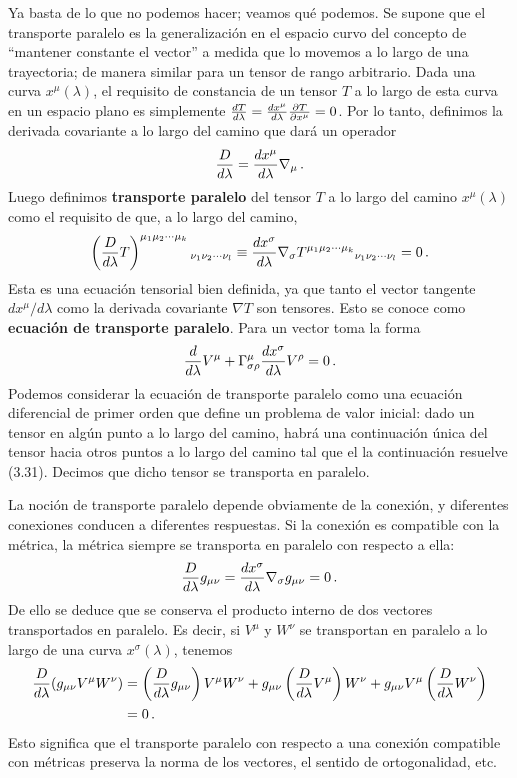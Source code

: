 \documentclass[11pt,b5paper,openany,twoside]{book}
\newcommand{\mn}{{\mu\nu}}
\begin{document}
Ya basta de lo que no podemos hacer; veamos qué podemos.
Se supone que el transporte paralelo es la generalización en el espacio curvo del concepto de ``mantener constante el vector'' a medida que lo movemos a lo largo de una trayectoria; de manera similar para un tensor de rango arbitrario.
Dada una curva $x^\mu(\lambda)$, el requisito de constancia de un tensor $T$ a lo largo de esta curva en un espacio plano es simplemente ${{dT}\over{d\lambda}} = {{dx^\mu}\over{d\lambda}}{{\partial T}\over{\partial x^\mu}}=0$.
Por lo tanto, definimos la derivada covariante a lo largo del camino que dará un operador
\begin{equation}
{{D}\over {d\lambda}} = {{dx^\mu}\over{d\lambda}}\nabla_\mu
\,.\label{3.30}
\end{equation}
Luego definimos {\bf transporte paralelo} del tensor $T$ a lo largo del camino $x^\mu(\lambda)$ como el requisito de que, a lo largo del camino,
\begin{equation}
\left({{D}\over{d\lambda}}T\right)^{\mu_1 \mu_2 \cdots
\mu_k}{}_{\nu_1 \nu_2 \cdots \nu_l} \equiv {{dx^\sigma}\over
{d\lambda}}\nabla_\sigma T^{\mu_1 \mu_2 \cdots
\mu_k}{}_{\nu_1 \nu_2 \cdots \nu_l} = 0\,.\label{3.31}
\end{equation}
Esta es una ecuación tensorial bien definida, ya que tanto el vector tangente $dx^\mu/d\lambda$ como la derivada covariante $\nabla T$ son tensores.
Esto se conoce como {\bf ecuación de transporte paralelo}.
Para un vector toma la forma
\begin{equation}
{{d}\over{d\lambda}} V^\mu
+ \Gamma^\mu_{\sigma\rho}{{dx^\sigma}\over{d\lambda}}V^\rho = 0\,.
\label{3.32}
\end{equation}
Podemos considerar la ecuación de transporte paralelo como una ecuación diferencial de primer orden que define un problema de valor inicial: dado un tensor en algún punto a lo largo del camino, habrá una continuación única del tensor hacia otros puntos a lo largo del camino tal que el la continuación resuelve (3.31).
Decimos que dicho tensor se transporta en paralelo.

La noción de transporte paralelo depende obviamente de la conexión, y diferentes conexiones conducen a diferentes respuestas.
Si la conexión es compatible con la métrica, la métrica siempre se transporta en paralelo con respecto a ella:
\begin{equation}
{{D}\over{d\lambda}}g_\mn = {{dx^\sigma}\over{d\lambda}}
\nabla_\sigma g_\mn =0\,.\label{3.33}
\end{equation}
De ello se deduce que se conserva el producto interno de dos vectores transportados en paralelo.
Es decir, si $V^\mu$ y $W^\nu$ se transportan en paralelo a lo largo de una curva $x^\sigma(\lambda)$, tenemos
\begin{align}
{{D}\over{d\lambda}}(g_\mn V^\mu W^\nu) &=
\left({{D}\over{d\lambda}}g_\mn\right)V^\mu W^\nu +
g_\mn \left({{D}\over{d\lambda}} V^\mu\right)W^\nu +
g_\mn V^\mu\left({{D}\over{d\lambda}} W^\nu\right) \notag \\
&=  0\,. \label{3.34}
\end{align}
Esto significa que el transporte paralelo con respecto a una conexión compatible con métricas preserva la norma de los vectores, el sentido de ortogonalidad, etc.
\end{document}

